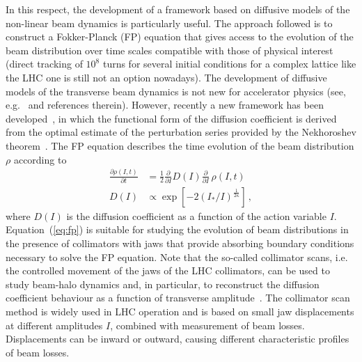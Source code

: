 In this respect, the development of a framework based on diffusive models of the non-linear beam dynamics is particularly useful. The approach followed is to construct a Fokker-Planck (FP) equation that gives access to the evolution of the beam distribution over time scales compatible with those of physical interest (direct tracking of $10^8$ turns for several initial conditions for a complex lattice like the LHC one is still not an option nowadays). The development of diffusive models of the transverse beam dynamics is not new for accelerator physics (see, e.g.~\cite{PhysRevLett.68.33,gerasimov1992applicability,MESS1994279,zimmermann1994transverse,PhysRevLett.77.1051,PhysRevSTAB.5.074001,stancari2011diffusion,PhysRevSTAB.15.101001} and references therein). However, recently a new framework has been developed~\cite{Bazzani:2019lse,bazzani2020diffusion,our_paper9}, in which the functional form of the diffusion coefficient is derived from the optimal estimate of the perturbation series provided by the Nekhoroshev theorem~\cite{Nekhoroshev:1977aa,Bazzani:1990aa,Turchetti:1990aa}. 
The FP equation describes the time evolution of the beam distribution $\rho$ according to 
%
\begin{equation}
    \begin{split}
        \frac{\partial \rho (I, t)}{\partial t} & =\frac{1}{2} \frac{\partial}{\partial I} {D}(I) \frac{\partial}{\partial I}\, \rho(I, t) \\
        D(I) & \propto\exp \left[-2\left({I_\ast} / {I}\right)^{\frac{1}{2\kappa}}\right]\, , 
    \end{split}
    \label{eq:fp}
\end{equation}
%
where $D(I)$ is the diffusion coefficient as a function of the action variable $I$. %
Equation~(\ref{eq:fp}) is suitable for studying the evolution of beam distributions in the presence of collimators with jaws that provide %
absorbing boundary conditions necessary to solve the FP equation. Note that the so-called collimator scans, i.e. the controlled movement of the jaws of the LHC collimators, can be used to study beam-halo dynamics and, in particular, to reconstruct the diffusion coefficient behaviour as a function of transverse amplitude~\cite{MESS1994279,stancari2011diffusion,PhysRevSTAB.16.021003,PhysRevAccelBeams.23.044802}. The collimator scan method is widely used in LHC operation and is based on small jaw displacements at different amplitudes $I$, combined with measurement of beam losses. Displacements can be inward or outward, causing different characteristic profiles of beam losses. 

